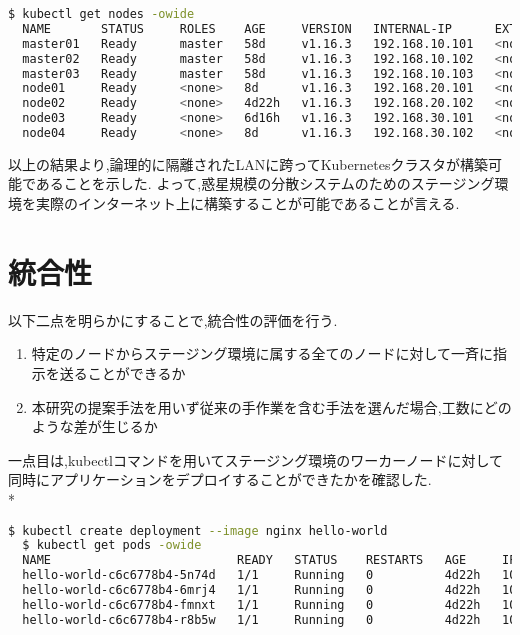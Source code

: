 \begin{lstlisting}[language=bash]
  $ kubectl get nodes -owide
  NAME       STATUS     ROLES    AGE     VERSION   INTERNAL-IP      EXTERNAL-IP   OS-IMAGE             KERNEL-VERSION      CONTAINER-RUNTIME
  master01   Ready      master   58d     v1.16.3   192.168.10.101   <none>        Ubuntu 18.04.3 LTS   4.15.0-70-generic   docker://18.9.7
  master02   Ready      master   58d     v1.16.3   192.168.10.102   <none>        Ubuntu 18.04.3 LTS   4.15.0-70-generic   docker://18.9.7
  master03   Ready      master   58d     v1.16.3   192.168.10.103   <none>        Ubuntu 18.04.3 LTS   4.15.0-70-generic   docker://18.9.7
  node01     Ready      <none>   8d      v1.16.3   192.168.20.101   <none>        Ubuntu 18.04.3 LTS   4.15.0-74-generic   docker://18.9.7
  node02     Ready      <none>   4d22h   v1.16.3   192.168.20.102   <none>        Ubuntu 18.04.3 LTS   4.15.0-74-generic   docker://18.9.7
  node03     Ready      <none>   6d16h   v1.16.3   192.168.30.101   <none>        Ubuntu 18.04.3 LTS   4.15.0-74-generic   docker://18.9.7
  node04     Ready      <none>   8d      v1.16.3   192.168.30.102   <none>        Ubuntu 18.04.3 LTS   4.15.0-74-generic   docker://18.9.7
\end{lstlisting}

以上の結果より,論理的に隔離されたLANに跨ってKubernetesクラスタが構築可能であることを示した.
よって,惑星規模の分散システムのためのステージング環境を実際のインターネット上に構築することが可能であることが言える.

\section{統合性}
\label{evaluation:method}

以下二点を明らかにすることで,統合性の評価を行う.

\begin{enumerate}
  \item 特定のノードからステージング環境に属する全てのノードに対して一斉に指示を送ることができるか
  \item 本研究の提案手法を用いず従来の手作業を含む手法を選んだ場合,工数にどのような差が生じるか
\end{enumerate}

一点目は,kubectlコマンドを用いてステージング環境のワーカーノードに対して同時にアプリケーションをデプロイすることができたかを確認した.\\*

\begin{lstlisting}[language=bash]
  $ kubectl create deployment --image nginx hello-world
  $ kubectl get pods -owide
  NAME                          READY   STATUS    RESTARTS   AGE     IP          NODE       NOMINATED NODE   READINESS GATES
  hello-world-c6c6778b4-5n74d   1/1     Running   0          4d22h   10.44.0.1   node01     <none>           <none>
  hello-world-c6c6778b4-6mrj4   1/1     Running   0          4d22h   10.42.0.1   node03     <none>           <none>
  hello-world-c6c6778b4-fmnxt   1/1     Running   0          4d22h   10.47.0.1   node02     <none>           <none>
  hello-world-c6c6778b4-r8b5w   1/1     Running   0          4d22h   10.44.0.2   node04   <none>           <none>
\end{lstlisting}

